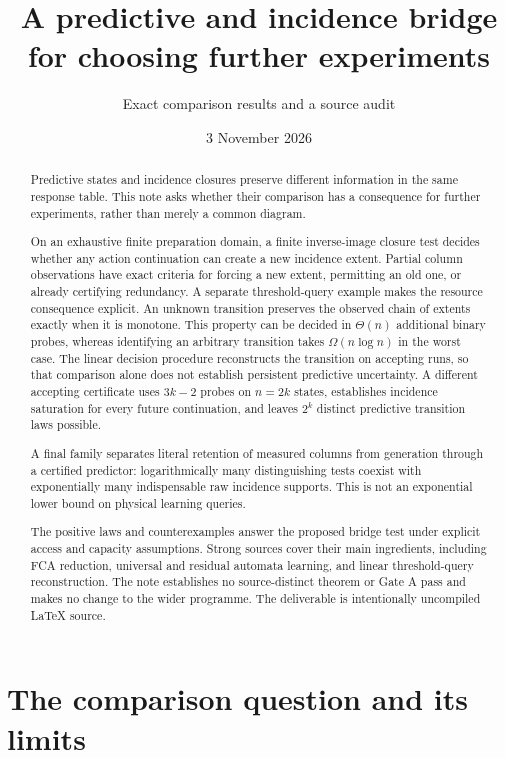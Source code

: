 \documentclass[11pt]{article}
\title{A predictive and incidence bridge for choosing further experiments}
\author{Exact comparison results and a source audit}
\date{3 November 2026}
\theoremstyle{remark}
\begin{document}
\maketitle
\begin{abstract}
Predictive states and incidence closures preserve different information in the same response table. This note asks whether their comparison has a consequence for further experiments, rather than merely a common diagram.

On an exhaustive finite preparation domain, a finite inverse-image closure test decides whether any action continuation can create a new incidence extent. Partial column observations have exact criteria for forcing a new extent, permitting an old one, or already certifying redundancy. A separate threshold-query example makes the resource consequence explicit. An unknown transition preserves the observed chain of extents exactly when it is monotone. This property can be decided in $\Theta(n)$ additional binary probes, whereas identifying an arbitrary transition takes $\Omega(n\log n)$ in the worst case. The linear decision procedure reconstructs the transition on accepting runs, so that comparison alone does not establish persistent predictive uncertainty. A different accepting certificate uses $3k-2$ probes on $n=2k$ states, establishes incidence saturation for every future continuation, and leaves $2^k$ distinct predictive transition laws possible.

A final family separates literal retention of measured columns from generation through a certified predictor: logarithmically many distinguishing tests coexist with exponentially many indispensable raw incidence supports. This is not an exponential lower bound on physical learning queries.

The positive laws and counterexamples answer the proposed bridge test under explicit access and capacity assumptions. Strong sources cover their main ingredients, including FCA reduction, universal and residual automata learning, and linear threshold-query reconstruction. The note establishes no source-distinct theorem or Gate A pass and makes no change to the wider programme. The deliverable is intentionally uncompiled \LaTeX{} source.
\end{abstract}
\tableofcontents

\section{The comparison question and its limits}
\label{sec:scope}
\end{document}

